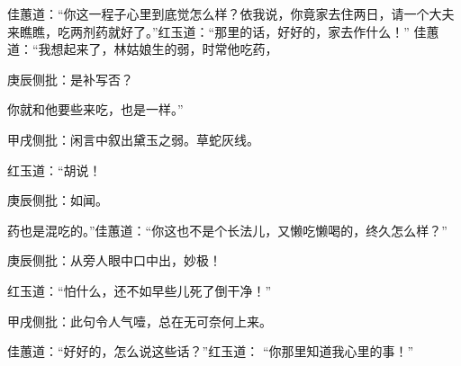 \begin{parag}


    佳蕙道：“你这一程子心里到底觉怎么样？依我说，你竟家去住两日，请一个大夫来瞧瞧，吃两剂药就好了。”红玉道：“那里的话，好好的，家去作什么！” 佳蕙道：“我想起来了，林姑娘生的弱，时常他吃药，\begin{note}庚辰侧批：是补写否？\end{note}你就和他要些来吃，也是一样。”\begin{note}甲戌侧批：闲言中叙出黛玉之弱。草蛇灰线。\end{note}红玉道：“胡说！\begin{note}庚辰侧批：如闻。\end{note}药也是混吃的。”佳蕙道：“你这也不是个长法儿，又懒吃懒喝的，终久怎么样？”\begin{note}庚辰侧批：从旁人眼中口中出，妙极！\end{note}红玉道：“怕什么，还不如早些儿死了倒干净！”\begin{note}甲戌侧批：此句令人气噎，总在无可奈何上来。\end{note}佳蕙道：“好好的，怎么说这些话？”红玉道： “你那里知道我心里的事！”
\end{parag}


